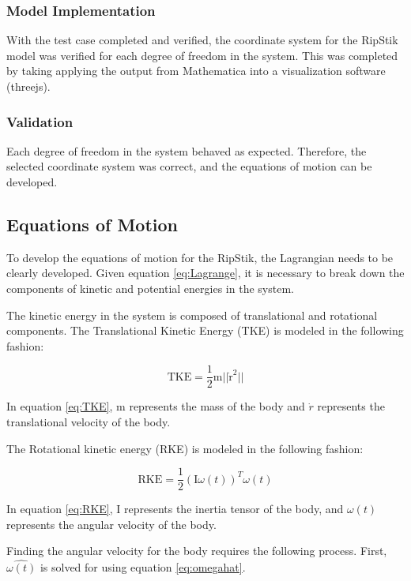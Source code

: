 \documentclass[12pt,letterpaper]{article}
\begin{document}
\subsubsection{Model Implementation}
With the test case completed and verified, the coordinate system for the RipStik model was verified for each degree of freedom in the system. 
This was completed by taking applying the output from Mathematica into a visualization software (threejs).

\subsubsection{Validation}
Each degree of freedom in the system behaved as expected. 
Therefore, the selected coordinate system was correct, and the equations of motion can be developed.

\subsection{Equations of Motion}
To develop the equations of motion for the RipStik, the Lagrangian needs to be clearly developed. Given equation \ref{eq:Lagrange}, it is necessary to break down the components of kinetic and potential energies in the system.

The kinetic energy in the system is composed of translational and rotational components.
The Translational Kinetic Energy (TKE) is modeled in the following fashion:

\begin{equation}
\label{eq:TKE}
\text{TKE} = \frac{1}{2}{\text{m}}{\lvert \lvert {\dot{\text{r}}^2} \rvert \rvert}
\end{equation}

In equation \ref{eq:TKE}, m represents the mass of the body and $\dot{r}$ represents the translational velocity of the body.
\par
The Rotational kinetic energy (RKE) is modeled in the following fashion:

\begin{equation}
\label{eq:RKE}
\text{RKE} = \frac{1}{2}({\text{I}}{\omega(t)})^T\omega(t)
\end{equation}

In equation \ref{eq:RKE}, I represents the inertia tensor of the body, and $\omega(t)$ represents the angular velocity of the body.

Finding the angular velocity for the body requires the following process. First, $\hat{\omega(t)}$ is solved for using equation \ref{eq:omegahat}.
\end{document}
